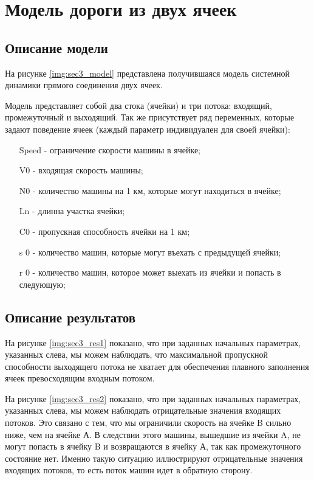 \section{Модель дороги из двух ячеек}

\subsection{Описание модели}

На рисунке \ref{img:sec3_model} представлена получившаяся модель системной динамики прямого соединения двух ячеек.

Модель представляет собой два стока (ячейки) и три потока: входящий, промежуточный и выходящий.
Так же присутствует ряд переменных, которые задают поведение ячеек (каждый параметр индивидуален для своей ячейки):
\begin{itemize}
    \item[Speed] - ограничение скорости машины в ячейке;
    \item[V0] - входящая скорость машины;
    \item[N0] - количество машины на 1 км, которые могут находиться в ячейке;
    \item[Ln] - длинна участка ячейки;
    \item[C0] - пропускная способность ячейки на 1 км;
    \item[s 0] - количество машин, которые могут въехать с предыдущей ячейки;
    \item[r 0] - количество машин, которое может выехать из ячейки и попасть в следующую;
\end{itemize}


\subsection{Описание результатов}

На рисунке \ref{img:sec3_res1} показано, что при заданных начальных параметрах, указанных слева, мы можем наблюдать, что максимальной пропускной способности выходящего потока не хватает для обеспечения плавного заполнения ячеек превосходящим входным потоком.


На рисунке \ref{img:sec3_res2} показано, что при заданных начальных параметрах, указанных слева, мы можем наблюдать отрицательные значения входящих потоков. Это связано с тем, что мы ограничили скорость на ячейке B сильно ниже, чем на ячейке А. В следствии этого машины, вышедшие из ячейки A, не могут попасть в ячейку B и возвращаются в ячейку А, так как промежуточного состояние нет. Именно такую ситуацию иллюстрируют отрицательные значения входящих потоков, то есть поток машин идет в обратную сторону.

